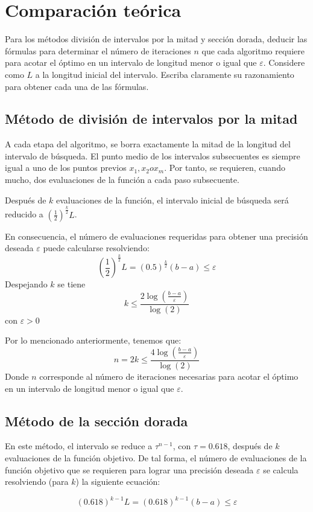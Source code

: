 \documentclass[12pt,oneside]{book}
\begin{document}
\section{Comparación teórica}
Para los métodos división de intervalos por la mitad y sección
dorada, deducir las fórmulas para determinar el número de iteraciones $n$ que
cada algoritmo requiere para acotar el óptimo en un intervalo de longitud menor
o igual que $\varepsilon$. Considere como $L$ a la longitud inicial del intervalo. Escriba
claramente su razonamiento para obtener cada una de las fórmulas.

\subsection*{Método de división de intervalos por la mitad}
A cada etapa del algoritmo, se borra exactamente la mitad de la longitud del intervalo de búsqueda.
El punto medio de los intervalos subsecuentes es siempre igual a uno de los puntos previos $x_1,x_2 o x_m$. Por tanto, se requieren, cuando mucho, dos evaluaciones de la función a cada paso
subsecuente.

Después de $k$ evaluaciones de la función, el intervalo inicial de búsqueda será reducido a $\left(\frac{1}{2}\right)^{\frac{k}{2}}L$.

En consecuencia, el número de evaluaciones requeridas para obtener una precisión deseada $\varepsilon$
puede calcularse resolviendo: \[\left(\frac{1}{2}\right)^{\frac{k}{2}}L = (0.5)^{\frac{k}{2}}(b-a)\leq \varepsilon\] Despejando $k$ se tiene 
\[k \leq \frac{2 \log\left(\frac{b-a}{\varepsilon}\right)}{\log(2)}\] con $\varepsilon >0$

Por lo mencionado anteriormente, tenemos que:
\[n = 2k \leq \frac{4\log\left(\frac{b-a}{\varepsilon}\right)}{\log(2)}\]
Donde $n$ corresponde al número de iteraciones necesarias para acotar el óptimo en un intervalo de
longitud menor o igual que $\varepsilon$.

\subsection*{Método de la sección dorada}
En este método, el intervalo se reduce a $\tau^{n-1}$, con $\tau = 0.618$, después de $k$ evaluaciones de la función objetivo. De tal forma, el número de evaluaciones de la función objetivo que se requieren
para lograr una precisión deseada $\varepsilon$ se calcula resolviendo (para $k$) la siguiente ecuación: 

\[(0.618)^{k-1}L=(0.618)^{k-1}(b-a) \leq \varepsilon\] 
\end{document}
